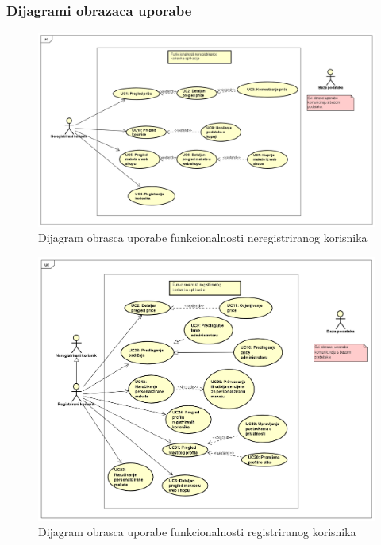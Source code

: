 				
				\subsubsection{Dijagrami obrazaca uporabe}
					
					\begin{figure}
						\centering
						\includegraphics[scale=0.34]{"slike/Funkcionalnost neregistriranog korisnika"}
						\caption{Dijagram obrasca uporabe funkcionalnosti neregistriranog korisnika}
						\label{fig:funkcionalnost-neregistriranog-korisnika}   
					\end{figure}
					
					\begin{figure}
						\centering
						\includegraphics[scale=0.34]{"slike/Funkcionalnost registriranog korisnika"}
						\caption{Dijagram obrasca uporabe funkcionalnosti registriranog korisnika}
						\label{fig:funkcionalnost-registriranog-korisnika}
					\end{figure}
					
